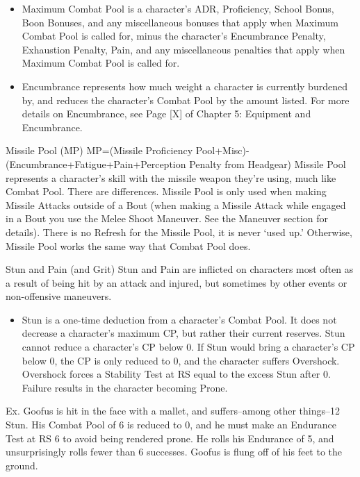 \documentclass[oneside,11pt,english]{book}
\begin{document}
 
\begin{itemize}
\item Maximum Combat Pool is a character's ADR, Proficiency, School Bonus, Boon Bonuses, and 
any miscellaneous bonuses that apply when Maximum Combat Pool is called for, minus the 
character's Encumbrance Penalty, Exhaustion Penalty, Pain, and any miscellaneous penalties that 
apply when Maximum Combat Pool is called for. 
\item Encumbrance represents how much weight a character is currently burdened by, and reduces 
the character's Combat Pool by the amount listed. For more details on Encumbrance, see Page 
[X] of Chapter 5: Equipment and Encumbrance. 
\end{itemize}
 

Missile Pool (MP) 
MP=(Missile Proficiency Pool+Misc)-(Encumbrance+Fatigue+Pain+Perception Penalty from Headgear) 
Missile Pool represents a character’s skill with the missile weapon they’re using, much like Combat Pool. 
There are differences. Missile Pool is only used when making Missile Attacks outside of a Bout (when 
making a Missile Attack while engaged in a Bout you use the Melee Shoot Maneuver. See the Maneuver 
section for details). There is no Refresh for the Missile Pool, it is never ‘used up.’ Otherwise, Missile 
Pool works the same way that Combat Pool does. 

 

Stun and Pain (and Grit) 
Stun and Pain are inflicted on characters most often as a result of being hit by an attack and injured, but 
sometimes by other events or non-offensive maneuvers. 

 
\begin{itemize}
\item Stun is a one-time deduction from a character's Combat Pool. It does not decrease a character's 
maximum CP, but rather their current reserves. Stun cannot reduce a character's CP below 0. If 
Stun would bring a character's CP below 0, the CP is only reduced to 0, and the character suffers 
Overshock. Overshock forces a Stability Test at RS equal to the excess Stun after 0. Failure 
results in the character becoming Prone. 
\end{itemize}
 

Ex. Goofus is hit in the face with a mallet, and suffers--among other things--12 Stun. His Combat 
Pool of 6 is reduced to 0, and he must make an Endurance Test at RS 6 to avoid being rendered 
prone. He rolls his Endurance of 5, and unsurprisingly rolls fewer than 6 successes. Goofus is 
flung off of his feet to the ground. 
\end{document}
